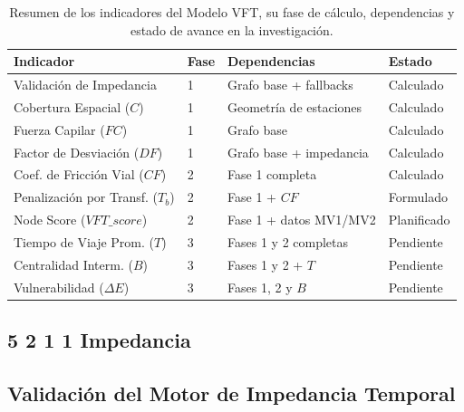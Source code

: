 \begin{table}[H]
    \centering
    \caption[Resumen de indicadores del Modelo VFT por fase]{Resumen de los
    indicadores del Modelo VFT, su fase de cálculo, dependencias y estado
    de avance en la investigación.}
    \label{tab:resumen-indicadores-cap5}
    \begin{tabularx}{\textwidth}{|l|l|X|l|}
        \hline
        \textbf{Indicador} & \textbf{Fase} & \textbf{Dependencias} & \textbf{Estado} \\
        \hline
        Validación de Impedancia    & 1 & Grafo base + fallbacks            & Calculado \\
        Cobertura Espacial ($C$)    & 1 & Geometría de estaciones           & Calculado \\
        Fuerza Capilar ($FC$)       & 1 & Grafo base                        & Calculado \\
        Factor de Desviación ($DF$) & 1 & Grafo base + impedancia           & Calculado \\
        \hline
        Coef. de Fricción Vial ($CF$)  & 2 & Fase 1 completa                & Calculado \\
        Penalización por Transf. ($T_b$) & 2 & Fase 1 + $CF$              & Formulado \\
        Node Score ($VFT\_score$)   & 2 & Fase 1 + datos MV1/MV2            & Planificado \\
        \hline
        Tiempo de Viaje Prom. ($T$) & 3 & Fases 1 y 2 completas             & Pendiente \\
        Centralidad Interm. ($B$)   & 3 & Fases 1 y 2 + $T$                 & Pendiente \\
        Vulnerabilidad ($\Delta E$) & 3 & Fases 1, 2 y $B$                  & Pendiente \\
        \hline
    \end{tabularx}
\end{table}

\subsection*{5 2 1 1 Impedancia}
\subsection{Validación del Motor de Impedancia Temporal}
\label{subsec:validacion-impedancia}

